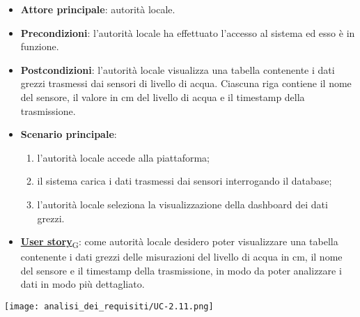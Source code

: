 \begin{itemize}
	\item \textbf{Attore principale}: autorità locale.
	\item \textbf{Precondizioni}: l'autorità locale ha effettuato l'accesso al sistema ed esso è in funzione.
	\item \textbf{Postcondizioni}: l'autorità locale visualizza una tabella contenente i dati grezzi trasmessi dai sensori di livello di acqua.
	      Ciascuna riga contiene il nome del sensore, il valore in cm del livello di acqua e il timestamp della trasmissione.
	\item \textbf{Scenario principale}:
	      \begin{enumerate}
		      \item l'autorità locale accede alla piattaforma;
		      \item il sistema carica i dati trasmessi dai sensori interrogando il database;
		      \item l'autorità locale seleziona la visualizzazione della dashboard dei dati grezzi.
	      \end{enumerate}
	\item \href{https://7last.github.io/docs/pb/documentazione-interna/glossario\#user-story}{\textbf{User story}\textsubscript{G}}:
	      come autorità locale desidero poter visualizzare una tabella contenente i dati grezzi delle misurazioni del livello di acqua in cm,
	      il nome del sensore e il timestamp della trasmissione, in modo da poter analizzare i dati in modo più dettagliato.
\end{itemize}
\begin{center}
	\texttt{[image: analisi\_dei\_requisiti/UC-2.11.png]}
\end{center}


